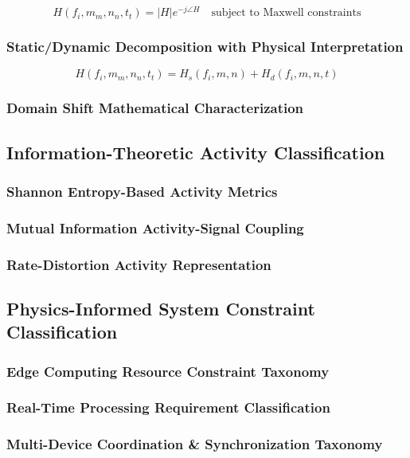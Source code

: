 \documentclass[journal]{IEEEtran}
\newcommand{\csi}[4]{H(f_{#1},m_{#2},n_{#3},t_{#4})}
\begin{document}
\begin{equation}
\csi{i}{m}{n}{t} = |H|e^{-j\angle H} \quad \text{subject to Maxwell constraints}
\label{eq:csi_maxwell}
\end{equation}

\subsubsection{Static/Dynamic Decomposition with Physical Interpretation}
\begin{equation}
\csi{i}{m}{n}{t} = H_s(f_i,m,n) + H_d(f_i,m,n,t)
\label{eq:static_dynamic}
\end{equation}

\subsubsection{Domain Shift Mathematical Characterization}

\subsection{Information-Theoretic Activity Classification}
\subsubsection{Shannon Entropy-Based Activity Metrics}
\subsubsection{Mutual Information Activity-Signal Coupling}
\subsubsection{Rate-Distortion Activity Representation}

\subsection{Physics-Informed System Constraint Classification}
\subsubsection{Edge Computing Resource Constraint Taxonomy}
\subsubsection{Real-Time Processing Requirement Classification}
\subsubsection{Multi-Device Coordination \& Synchronization Taxonomy}
\end{document}
